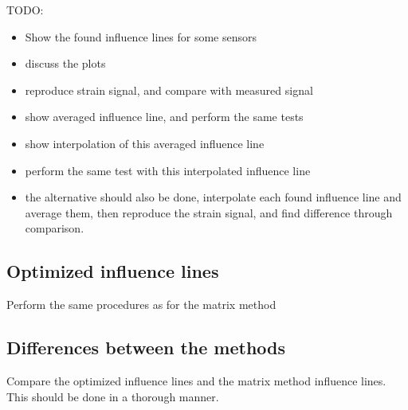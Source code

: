 TODO:
\begin{itemize}
\item Show the found influence lines for some sensors
\item discuss the plots
\item reproduce strain signal, and compare with measured signal
\item show averaged influence line, and perform the same tests
\item show interpolation of this averaged influence line
\item perform the same test with this interpolated influence line
\item the alternative should also be done, interpolate each found influence line and average them, then reproduce the strain signal, and find difference through comparison.
\end{itemize}

\subsection{Optimized influence lines}
Perform the same procedures as for the matrix method

\subsection{Differences between the methods}
Compare the optimized influence lines and the matrix method influence lines. This should be done in a thorough manner.
